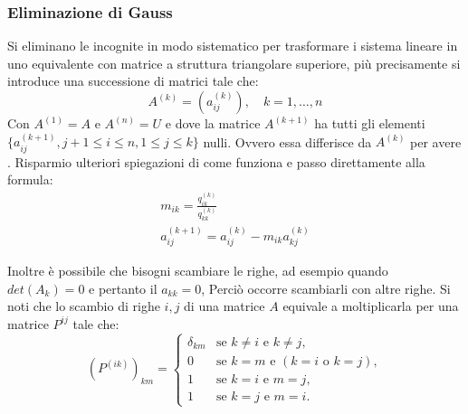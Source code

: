
\subsubsection{Eliminazione di Gauss}

Si eliminano le incognite in modo sistematico per trasformare i sistema lineare in uno equivalente con matrice a struttura triangolare superiore, più precisamente si introduce una successione di matrici tale che:
\[
            A^{(k)} = (a_{ij}^{(k)}), \quad k = 1,\dots,n
\]
Con $A^{(1)} = A$ e $A^{(n)} = U$ e dove la matrice $A^{(k+1)}$ ha tutti gli elementi $\{a_{ij}^{(k+1)}, j+1 \leq i\leq n, 1\leq j \leq k\}$ nulli. Ovvero essa differisce da $A^{(k)}$ per avere . Risparmio ulteriori spiegazioni di come funziona e passo direttamente alla formula:
\[
    \begin{array}{l}
        m_{ik} = \frac{q_{ik} ^ {(k)}}{q_{kk} ^ {(k)}} \\
        a_{ij}^{(k+1)} = a_{ij}^{(k)} - m_{ik} a_{kj} ^ {(k)}
    \end{array}
\]


Inoltre è possibile che bisogni scambiare le righe, ad esempio quando $det(A_k) = 0$ e pertanto il $a_{kk} = 0$, Perciò occorre scambiarli con altre righe. Si noti che lo scambio di righe $i,j$ di una matrice $A$ equivale a moltiplicarla per una matrice $P^{ij}$ tale che:
\[
    (P^{(ik)})_{km} =
        \begin{cases} 
            \delta_{km} & \text{se } k \neq i \text{ e } k \neq j, \\ 
            0 & \text{se } k = m \text{ e } (k = i \text{ o } k = j), \\ 
            1 & \text{se } k = i \text{ e } m = j, \\ 
            1 & \text{se } k = j \text{ e } m = i.
        \end{cases}
\]


